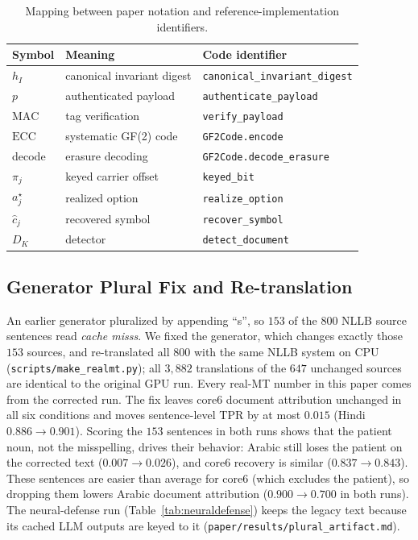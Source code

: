 \documentclass[11pt]{article}
\begin{document}
\begin{table}[t]
\centering
\caption{Mapping between paper notation and reference-implementation identifiers.}
\label{tab:notation}
\renewcommand{\arraystretch}{1.2}
\footnotesize
\begin{tabularx}{\linewidth}{@{}l>{\raggedright\arraybackslash}X>{\raggedright\arraybackslash}X@{}}
\toprule
Symbol & Meaning & Code identifier \\
\midrule
$h_I$ & canonical invariant digest & \texttt{canonical\_\allowbreak invariant\_\allowbreak digest} \\
$p$ & authenticated payload & \texttt{authenticate\_\allowbreak payload} \\
$\mathrm{MAC}$ & tag verification & \texttt{verify\_payload} \\
$\mathrm{ECC}$ & systematic GF(2) code & \texttt{GF2Code.encode} \\
decode & erasure decoding & \texttt{GF2Code.\allowbreak decode\_\allowbreak erasure} \\
$\pi_j$ & keyed carrier offset & \texttt{keyed\_bit} \\
$a_j^\star$ & realized option & \texttt{realize\_option} \\
$\hat c_j$ & recovered symbol & \texttt{recover\_symbol} \\
$D_K$ & detector & \texttt{detect\_document} \\
\bottomrule
\end{tabularx}
\end{table}

\subsection{Generator Plural Fix and Re-translation}
\label{app:plural}
An earlier generator pluralized by appending ``s'', so $153$ of the $800$ NLLB source sentences read \emph{cache misss}. We fixed the generator, which changes exactly those $153$ sources, and re-translated all $800$ with the same NLLB system on CPU (\texttt{scripts/\allowbreak make\_realmt.py}); all $3{,}882$ translations of the $647$ unchanged sources are identical to the original GPU run. Every real-MT number in this paper comes from the corrected run. The fix leaves core6 document attribution unchanged in all six conditions and moves sentence-level TPR by at most $0.015$ (Hindi $0.886\to0.901$). Scoring the $153$ sentences in both runs shows that the patient noun, not the misspelling, drives their behavior: Arabic still loses the patient on the corrected text ($0.007\to0.026$), and core6 recovery is similar ($0.837\to0.843$). These sentences are easier than average for core6 (which excludes the patient), so dropping them lowers Arabic document attribution ($0.900\to0.700$ in both runs). The neural-defense run (Table~\ref{tab:neuraldefense}) keeps the legacy text because its cached LLM outputs are keyed to it (\texttt{paper/results/plural\_artifact.md}).
\end{document}

